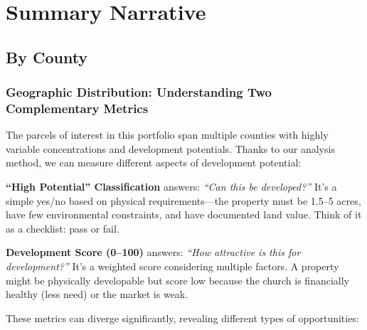 \documentclass[
  letterpaper,
  DIV=11,
  numbers=noendperiod,
  oneside]{scrreprt}
\begin{document}
\section{Summary Narrative}\label{summary-narrative}

\subsection{By County}\label{by-county}

\subsubsection{Geographic Distribution: Understanding Two Complementary
Metrics}\label{geographic-distribution-understanding-two-complementary-metrics}

The parcels of interest in this portfolio span multiple counties with
highly variable concentrations and development potentials. Thanks to our
analysis method, we can measure different aspects of development
potential:

\textbf{``High Potential'' Classification} answers: \emph{``Can this be
developed?''} It's a simple yes/no based on physical requirements---the
property must be 1.5--5 acres, have few environmental constraints, and
have documented land value. Think of it as a checklist: pass or fail.

\textbf{Development Score (0--100)} answers: \emph{``How attractive is
this for development?''} It's a weighted score considering multiple
factors. A property might be physically developable but score low
because the church is financially healthy (less need) or the market is
weak.

These metrics can diverge significantly, revealing different types of
opportunities:
\end{document}
